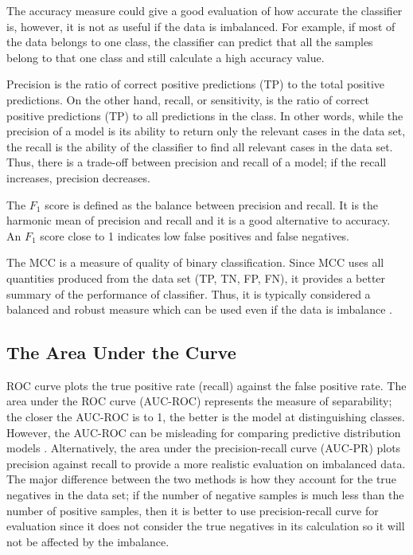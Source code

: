 The accuracy measure could give a good evaluation of how accurate the classifier is, however, it is not as useful if the data is imbalanced. For example, if most of the data belongs to one class, the classifier can predict that all the samples belong to that one class and still calculate a high accuracy value.

Precision is the ratio of correct positive predictions (TP) to the total positive predictions. On the other hand, recall, or sensitivity, is the ratio of correct positive predictions (TP) to all predictions in the class. In other words, while the precision of a model is its ability to return only the relevant cases in the data set, the recall is the ability of the classifier to find all relevant cases in the data set. Thus, there is a trade-off between precision and recall of a model; if the recall increases, precision decreases.

The $F_{1}$ score is defined as the balance between precision and recall. It is the harmonic mean of precision and recall and it is a good alternative to accuracy. An $F_{1}$ score close to 1 indicates low false positives and false negatives.

The \ac{MCC} is a measure of quality of binary classification. Since \ac{MCC} uses all quantities produced from the data set (TP, TN, FP, FN), it provides a better summary of the performance of classifier. Thus, it is typically considered a balanced and robust measure which can be used even if the data is imbalance \cite{boughorbel_optimal_2017}.

\subsection{The Area Under the Curve}

\ac{ROC} curve plots the true positive rate (recall) against the false positive rate. The area under the \ac{ROC} curve (AUC-ROC) represents the measure of separability; the closer the AUC-ROC is to 1, the better is the model at distinguishing classes. However, the AUC-ROC can be misleading for comparing predictive distribution models \cite{lobo_auc:_2008}.
Alternatively, the area under the precision-recall curve (AUC-PR) plots precision against recall to provide a more realistic evaluation on imbalanced data. The major difference between the two methods is how they account for the true negatives in the data set; if the number of negative samples is much less than the number of positive samples, then it is better to use precision-recall curve for evaluation since it does not consider the true negatives in its calculation so it will not be affected by the imbalance.
